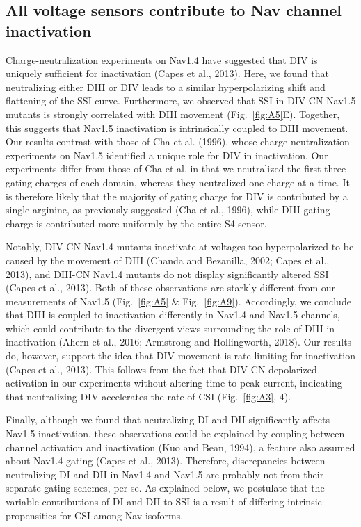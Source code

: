 \subsection{All voltage sensors contribute to Nav channel inactivation}
Charge-neutralization experiments on Nav1.4 have suggested that DIV is uniquely sufficient for inactivation (Capes et al., 2013). Here, we found that neutralizing either DIII or DIV leads to a similar hyperpolarizing shift and flattening of the SSI curve. Furthermore, we observed that SSI in DIV-CN Nav1.5 mutants is strongly correlated with DIII movement (Fig.~\ref{fig:A5}E). Together, this suggests that Nav1.5 inactivation is intrinsically coupled to DIII movement. Our results contrast with those of Cha et al. (1996), whose charge neutralization experiments on Nav1.5 identified a unique role for DIV in inactivation. Our experiments differ from those of Cha et al. in that we neutralized the first three gating charges of each domain, whereas they neutralized one charge at a time. It is therefore likely that the majority of gating charge for DIV is contributed by a single arginine, as previously suggested (Cha et al., 1996), while DIII gating charge is contributed more uniformly by the entire S4 sensor. 

Notably, DIV-CN Nav1.4 mutants inactivate at voltages too hyperpolarized to be caused by the movement of DIII (Chanda and Bezanilla, 2002; Capes et al., 2013), and DIII-CN Nav1.4 mutants do not display significantly altered SSI (Capes et al., 2013). Both of these observations are starkly different from our measurements of Nav1.5 (Fig.~\ref{fig:A5} \& Fig.~\ref{fig:A9}). Accordingly, we conclude that DIII is coupled to inactivation differently in Nav1.4 and Nav1.5 channels, which could contribute to the divergent views surrounding the role of DIII in inactivation (Ahern et al., 2016; Armstrong and Hollingworth, 2018). Our results do, however, support the idea that DIV movement is rate-limiting for inactivation (Capes et al., 2013). This follows from the fact that DIV-CN depolarized activation in our experiments without altering time to peak current, indicating that neutralizing DIV accelerates the rate of CSI (Fig.~\ref{fig:A3}, 4).

Finally, although we found that neutralizing DI and DII significantly affects Nav1.5 inactivation, these observations could be explained by coupling between channel activation and inactivation (Kuo and Bean, 1994), a feature also assumed about Nav1.4 gating (Capes et al., 2013). Therefore, discrepancies between neutralizing DI and DII in Nav1.4 and Nav1.5 are probably not from their separate gating schemes, per se. As explained below, we postulate that the variable contributions of DI and DII to SSI is a result of differing intrinsic propensities for CSI among Nav isoforms.

